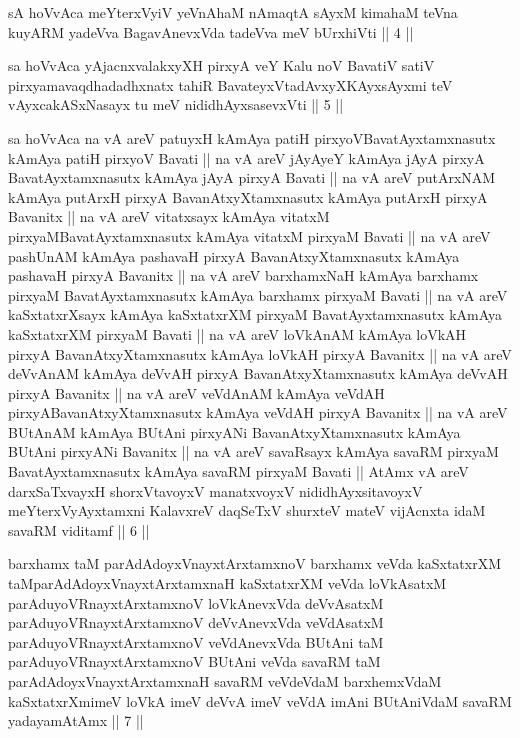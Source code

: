 \begin{kandikeshl}
sA hoVvAca meYterxVyiV yeVnAhaM nAmaqtA sAyxM kimahaM teVna kuyARM yadeVva BagavAnevxVda tadeVva meV bUrxhiVti || 4 ||
\end{kandikeshl}

\begin{kandikeshl}
sa hoVvAca yAjacnxvalakxyXH pirxyA veY Kalu noV BavatiV satiV pirxyamavaqdhadadhxnatx tahiR BavateyxVtadAvxyXKAyxsAyxmi teV vAyxcakASxNasayx tu meV nididhAyxsasevxVti || 5 ||
\end{kandikeshl}

\begin{kandikeshl}
sa hoVvAca na vA areV patuyxH kAmAya patiH pirxyoV\break BavatAyxtamxnasutx kAmAya patiH pirxyoV Bavati || na vA areV jAyAyeY kAmAya jAyA pirxyA BavatAyxtamxnasutx kAmAya jAyA pirxyA Bavati || na vA areV putArxNAM kAmAya putArxH pirxyA BavanAtxyXtamxnasutx kAmAya putArxH pirxyA Bavanitx || na vA areV vitatxsayx kAmAya vitatxM pirxyaM\break BavatAyxtamxnasutx kAmAya vitatxM pirxyaM Bavati || na vA areV pashUnAM kAmAya pashavaH pirxyA BavanAtxyXtamxnasutx kAmAya pashavaH pirxyA Bavanitx || na vA areV barxhamxNaH kAmAya barxhamx pirxyaM BavatAyxtamxnasutx kAmAya barxhamx pirxyaM Bavati || na vA areV kaSxtatxrXsayx kAmAya kaSxtatxrXM pirxyaM BavatAyxtamxnasutx kAmAya kaSxtatxrXM pirxyaM Bavati || na vA areV loVkAnAM kAmAya loVkAH pirxyA BavanAtxyXtamxnasutx kAmAya loVkAH pirxyA Bavanitx || na vA areV deVvAnAM kAmAya deVvAH pirxyA BavanAtxyXtamxnasutx kAmAya deVvAH pirxyA Bavanitx || na vA areV veVdAnAM kAmAya veVdAH pirxyA\break BavanAtxyXtamxnasutx kAmAya veVdAH pirxyA Bavanitx || na vA areV BUtAnAM kAmAya BUtAni pirxyANi BavanAtxyXtamxnasutx kAmAya BUtAni pirxyANi Bavanitx || na vA areV savaRsayx kAmAya savaRM pirxyaM BavatAyxtamxnasutx kAmAya savaRM pirxyaM Bavati || AtAmx vA areV darxSaTxvayxH shorxVtavoyxV manatxvoyxV nididhAyxsitavoyxV meYterxVyAyxtamxni KalavxreV daqSeTxV shurxteV mateV vijAcnxta idaM savaRM viditamf || 6 ||
\end{kandikeshl}

\begin{kandikeshl}
barxhamx taM parAdAdoyxV\s nayxtArxtamxnoV barxhamx veVda kaSxtatxrXM taM\break parAdAdoyxV\s nayxtArxtamxnaH kaSxtatxrXM veVda loVkAsatxM parAduyoVR\s nayx\-\break tArxtamxnoV loVkAnevxVda deVvAsatxM parAduyoVR\s nayxtArxtamxnoV deVvAnevxVda veVdAsatxM parAduyoVR\s nayxtArxtamxnoV veVdAnevxVda BUtAni taM parAduyoVR\s nayxtArxtamxnoV BUtAni veVda savaRM taM parAdAdoyxV\s nayxtArxtamxnaH savaRM veVdeVdaM barxhemxVdaM kaSxtatxrXmimeV loVkA imeV deVvA imeV veVdA imAni BUtAniVdaM savaRM yadayamAtAmx || 7 ||
\end{kandikeshl}

